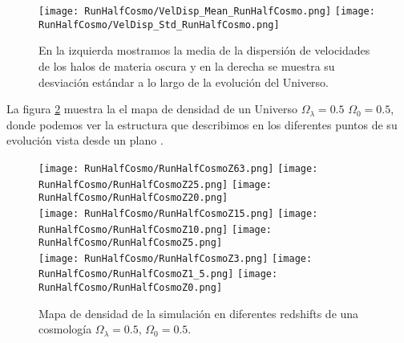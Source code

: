 \begin{figure}[H]
    \centering
    \texttt{[image: RunHalfCosmo/VelDisp\_Mean\_RunHalfCosmo.png]}
    \texttt{[image: RunHalfCosmo/VelDisp\_Std\_RunHalfCosmo.png]}
    \caption[Media y desviación estándar de la dispersión de velocidades]{\footnotesize En la izquierda mostramos la media de la dispersión de velocidades de los halos de materia oscura y en la derecha se muestra su desviación estándar a lo largo de la evolución del Universo.}
    \label{fig:HalfCosmo-VelDispStats}
\end{figure}

La figura \ref{fig:HalfCosmo-DensityMap} muestra la el mapa de densidad de un Universo $\Omega_\lambda = 0.5 $ $\Omega_0 = 0.5$, donde podemos ver la estructura que describimos  en los diferentes puntos de su evolución vista desde un plano .
\begin{figure}[H]
    \centering

    \texttt{[image: RunHalfCosmo/RunHalfCosmoZ63.png]}   %
    \texttt{[image: RunHalfCosmo/RunHalfCosmoZ25.png]}   %
    \texttt{[image: RunHalfCosmo/RunHalfCosmoZ20.png]}   %
    \\
    \texttt{[image: RunHalfCosmo/RunHalfCosmoZ15.png]}   %
    \texttt{[image: RunHalfCosmo/RunHalfCosmoZ10.png]}   %
    \texttt{[image: RunHalfCosmo/RunHalfCosmoZ5.png]}    %
    \\
    \texttt{[image: RunHalfCosmo/RunHalfCosmoZ3.png]}    %
    \texttt{[image: RunHalfCosmo/RunHalfCosmoZ1\_5.png]}  %
    \texttt{[image: RunHalfCosmo/RunHalfCosmoZ0.png]}    %
    \caption[Mapa de densidad en en diferentes redshift]{ \footnotesize Mapa de densidad de la simulación en diferentes redshifts de una cosmología $\Omega_\lambda = 0.5 $, $\Omega_0 = 0.5$. }
    \label{fig:HalfCosmo-DensityMap}
\end{figure}

